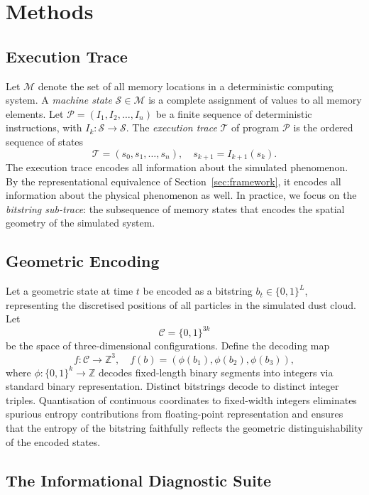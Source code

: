\documentclass[11pt]{article}
\begin{document}
\section{Methods}
\label{sec:methods}

\subsection{Execution Trace}

Let $\mathcal{M}$ denote the set of all memory locations in a deterministic
computing system. A \emph{machine state} $\mathcal{S} \in \mathcal{M}$ is a
complete assignment of values to all memory elements. Let
$\mathcal{P} = (I_1, I_2, \dots, I_n)$ be a finite sequence of deterministic
instructions, with $I_k : \mathcal{S} \to \mathcal{S}$. The
\emph{execution trace} $\mathcal{T}$ of program $\mathcal{P}$ is the ordered
sequence of states
\[
\mathcal{T} = (s_0, s_1, \dots, s_n), \quad s_{k+1} = I_{k+1}(s_k).
\]
The execution trace encodes all information about the simulated phenomenon.
By the representational equivalence of Section~\ref{sec:framework}, it
encodes all information about the physical phenomenon as well. In practice,
we focus on the \emph{bitstring sub-trace}: the subsequence of memory states
that encodes the spatial geometry of the simulated system.

\subsection{Geometric Encoding}

Let a geometric state at time $t$ be encoded as a bitstring
$b_t \in \{0,1\}^L$, representing the discretised positions of all particles
in the simulated dust cloud. Let
\[
\mathcal{C} = \{0,1\}^{3k}
\]
be the space of three-dimensional configurations. Define the decoding map
\[
f : \mathcal{C} \to \mathbb{Z}^3, \quad f(b) =
(\phi(b_1), \phi(b_2), \phi(b_3)),
\]
where $\phi : \{0,1\}^k \to \mathbb{Z}$ decodes fixed-length binary segments
into integers via standard binary representation.
Distinct bitstrings decode to distinct integer triples.
Quantisation of continuous coordinates to fixed-width integers eliminates
spurious entropy contributions from floating-point representation and ensures
that the entropy of the bitstring faithfully reflects the geometric
distinguishability of the encoded states.

\subsection{The Informational Diagnostic Suite}
\end{document}
